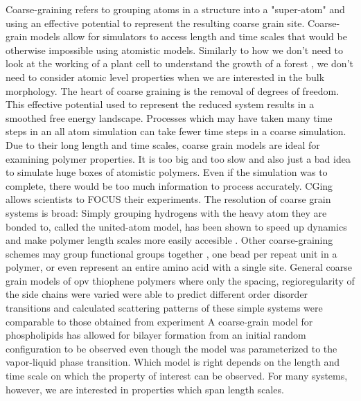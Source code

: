 Coarse-graining refers to grouping atoms in a structure into a "super-atom" and using an effective potential to represent the resulting coarse grain site.
Coarse-grain models allow for simulators to access length and time scales that would be otherwise impossible using atomistic models.
Similarly to how we don't need to look at the working of a plant cell to understand the growth of a forest \cite{Muller-Plathe2002}, we don't need to consider atomic level properties when we are interested in the bulk morphology.
The heart of coarse graining is the removal of degrees of freedom. 
This effective potential used to represent the reduced system results in a smoothed free energy landscape. 
Processes which may have taken many time steps in an all atom simulation can take fewer time steps in a coarse simulation.\cite{Berendsen2010}
Due to their long length and time scales, coarse grain models are ideal for examining polymer properties.\cite{Gartner2019a}
It is too big and too slow and also just a bad idea to simulate huge boxes of atomistic polymers.
Even if the simulation was to complete, there would be too much information to process accurately. 
CGing allows scientists to FOCUS their experiments.\cite{Baschnagel2000}
The resolution of coarse grain systems is broad:
Simply grouping hydrogens with the heavy atom they are bonded to, called the united-atom model, has been shown to speed up dynamics and make polymer length scales more easily accesible \cite{Paul1995a, Yang2006a,}.
Other coarse-graining schemes may group functional groups together \cite{Berendsen2010, Jankowski2013, Marsh2014}, one bead per repeat unit in a polymer\cite{Lee2011}, or even represent an entire amino acid with a single site\cite{Peng2019a}.
General coarse grain models of opv thiophene polymers where only the spacing, regioregularity of the side chains were varied were able to predict different order disorder transitions and calculated scattering patterns of these simple systems were comparable to those obtained from experiment \cite{Jankowski2013, Marsh2014} 
A coarse-grain model for phospholipids has allowed for bilayer formation from an initial random configuration to be observed even though the model was parameterized to the vapor-liquid phase transition.\cite{Shelley2001}
Which model is right depends on the length and time scale on which the property of interest can be observed.
For many systems, however, we are interested in properties which span length scales.
